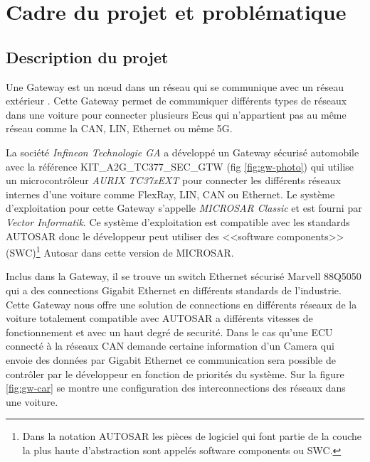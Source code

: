 \section{Cadre du projet et probl\'ematique}

\subsection{Description du projet}

Une Gateway est un nœud dans un réseau qui se communique avec un réseau extérieur \cite{gateway-definition}. Cette Gateway permet de communiquer différents types de réseaux dans une voiture pour connecter plusieurs Ecus qui n'appartient pas au même réseau comme la CAN, LIN, Ethernet ou même 5G. 

La société \textit{Infineon Technologie GA} a développé un Gateway sécurisé automobile avec la référence KIT\_A2G\_TC377\_SEC\_GTW \cite{gateway} (fig \ref{fig:gw-photo}) qui utilise un microcontrôleur \textit{AURIX TC37xEXT} pour connecter les différents réseaux internes d'une voiture comme FlexRay, LIN, CAN ou Ethernet. Le système d'exploitation pour cette Gateway s'appelle \textit{MICROSAR Classic} \cite{vector.microsar} et est fourni par \textit{Vector Informatik}. Ce système d'exploitation est compatible avec les standards AUTOSAR\cite{autosar-intro} donc le développeur peut utiliser des <<software components>> (SWC)\footnote{Dans la notation AUTOSAR les pièces de logiciel qui font partie de la couche la plus haute d'abstraction sont appel\'es software components ou SWC\cite{swc_man}.} Autosar dans cette version de MICROSAR. 

Inclus dans la Gateway, il se trouve un switch Ethernet sécurisé Marvell 88Q5050\cite{sw88Q5050} qui a des connections Gigabit Ethernet en différents standards de l'industrie. Cette Gateway nous offre une solution de connections en différents réseaux de la voiture totalement compatible avec AUTOSAR a différents vitesses de fonctionnement et avec un haut degré de securit\'e. Dans le cas qu'une ECU connect\'e à la réseaux CAN demande certaine information d'un Camera qui envoie des données par Gigabit Ethernet ce communication sera possible de contrôler par le développeur en fonction de priorités du système. Sur la figure \ref{fig:gw-car} se montre une configuration des interconnections des réseaux dans une voiture. 

